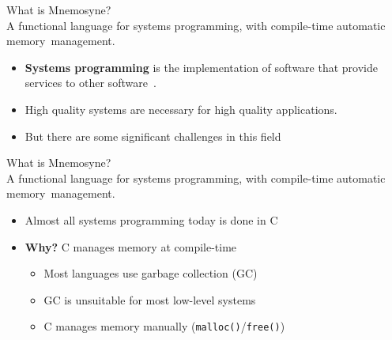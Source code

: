 \documentclass{beamer}
\begin{document}
\begin{frame}
\alert{\huge{What is Mnemosyne?}}\\
\large{A functional language \alert{for systems programming}, with compile-time automatic memory~management.}
\normalsize
\begin{itemize}
\item<1->
    \textbf{Systems programming} is the implementation of software that provide services to other software~\cite{Narten:2003:SP:1074100.1074850,Shapiro:2006:PLC:1215995.1216004}.
    \item <2-> High quality systems are necessary for high quality applications.
\item <3-> But there are some significant challenges in this field~\cite{whyrust,Shapiro:2006:PLC:1215995.1216004}
\end{itemize}
\end{frame}

\begin{frame}
\alert{\huge{What is Mnemosyne?}}\\
\large{A functional language for systems programming, \alert{with compile-time automatic memory~management}.}\normalsize
\begin{itemize}
\item Almost all
systems
programming today is done in C~\cite{Shapiro:2006:PLC:1215995.1216004,hawblitzel2004low}

    \item<2-> \textbf{Why?} C manages memory at compile-time
    \begin{itemize}
        \item<3-> Most languages use garbage collection (GC)~\cite{Bartley:2003:GC:1074100.1074419}
        \item<3-> GC is unsuitable for most low-level systems~\cite{hawblitzel2004low,Shapiro:2006:PLC:1215995.1216004,Hertz:2005:QPG:1094811.1094836}
        \item<3-> C manages memory manually (\texttt{malloc()}/\texttt{free()})~\cite{Shapiro:2006:PLC:1215995.1216004,kernighan1988c,Hertz:2005:QPG:1094811.1094836}
    \end{itemize}
\end{itemize}
\end{frame}
\end{document}
